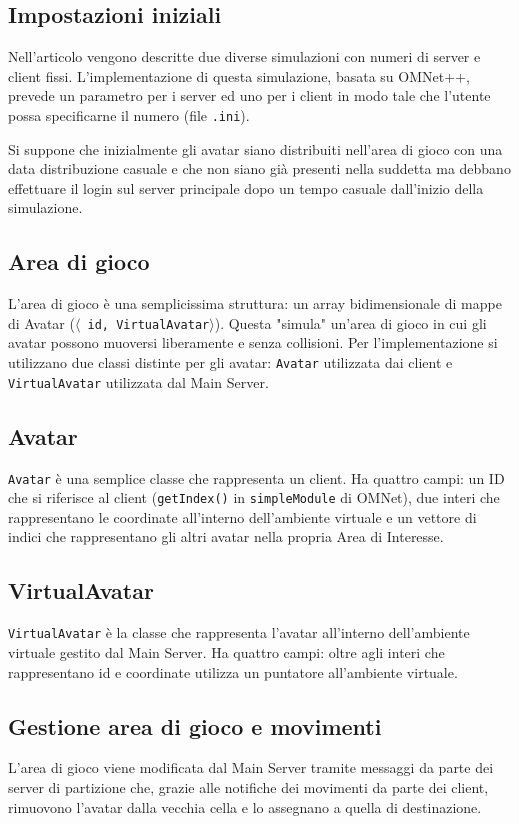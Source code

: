 \documentclass{article}
\begin{document}
\subsection{Impostazioni iniziali}
Nell'articolo vengono descritte due diverse simulazioni con numeri di server
e client fissi. L'implementazione di questa simulazione, basata su OMNet++,
prevede un parametro per i server ed uno per i client in modo tale che l'utente
possa specificarne il numero (file \texttt{.ini}). 

Si suppone che inizialmente gli avatar siano distribuiti nell'area di gioco
con una data distribuzione casuale e che non siano già presenti nella suddetta
ma debbano effettuare il login sul server principale dopo un tempo casuale
dall'inizio della simulazione. 

\subsection{Area di gioco}
L'area di gioco è una semplicissima struttura: un array
bidimensionale di mappe di Avatar (\texttt{$\langle$ id, VirtualAvatar$\rangle$}).
Questa
"simula" un'area di gioco in cui gli avatar possono muoversi liberamente e
senza collisioni. Per l'implementazione si utilizzano due classi distinte
per gli avatar: \texttt{Avatar} utilizzata dai client e 
\texttt{VirtualAvatar} utilizzata dal Main Server.

\subsection{Avatar}
\texttt{Avatar} è una semplice classe che rappresenta un client. Ha quattro campi:
un ID che si riferisce al client (\texttt{getIndex()} in
\texttt{simpleModule} di OMNet),
due interi che rappresentano le coordinate all'interno dell'ambiente virtuale e
un vettore di indici che rappresentano gli altri avatar nella propria Area di 
Interesse.

\subsection{VirtualAvatar}
\texttt{VirtualAvatar} è la classe che rappresenta l'avatar all'interno
dell'ambiente
virtuale gestito dal Main Server. Ha quattro campi: oltre agli interi che
rappresentano id e coordinate utilizza un puntatore all'ambiente virtuale.

\subsection{Gestione area di gioco e movimenti}
L'area di gioco viene modificata dal Main Server tramite messaggi da parte
dei server di partizione che, grazie alle notifiche dei
movimenti da parte dei client, rimuovono l'avatar dalla vecchia cella
e lo assegnano a quella di destinazione.
 
\end{document}
